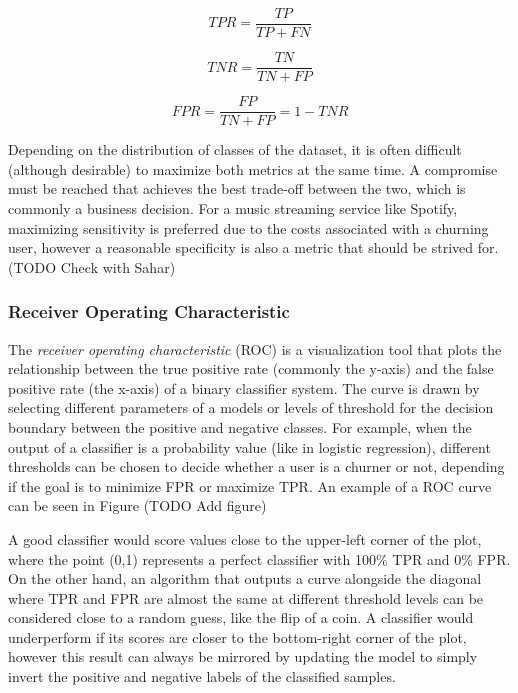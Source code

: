 \documentclass{kththesis}
\begin{document}
\begin{equation}
TPR = \frac{TP}{TP + FN}
\end{equation}

\begin{equation}
TNR = \frac{TN}{TN + FP}
\end{equation}

\begin{equation}
FPR = \frac{FP}{TN + FP} = 1 - TNR
\end{equation}

Depending on the distribution of classes of the dataset, it is often difficult (although desirable) to maximize both metrics at the same time. A compromise must be reached that achieves the best trade-off between the two, which is commonly a business decision. For a music streaming service like Spotify, maximizing sensitivity is preferred due to the costs associated with a churning user, however a reasonable specificity is also a metric that should be strived for. (TODO Check with Sahar)

\subsubsection{Receiver Operating Characteristic}

The \emph{receiver operating characteristic} (ROC) is a visualization tool that plots the relationship between the true positive rate (commonly the y-axis) and the false positive rate (the x-axis) of a binary classifier system. The curve is drawn by selecting different parameters of a models or levels of threshold for the decision boundary between the positive and negative classes. For example, when the output of a classifier is a probability value (like in logistic regression), different thresholds can be chosen to decide whether a user is a churner or not, depending if the goal is to minimize FPR or maximize TPR. An example of a ROC curve can be seen in Figure (TODO Add figure)

A good classifier would score values close to the upper-left corner of the plot, where the point (0,1) represents a perfect classifier with 100\% TPR and 0\% FPR. On the other hand, an algorithm that outputs a curve alongside the diagonal where TPR and FPR are almost the same at different threshold levels can be considered close to a random guess, like the flip of a coin. A classifier would underperform if its scores are closer to the bottom-right corner of the plot, however this result can always be mirrored by updating the model to simply invert the positive and negative labels of the classified samples.
\end{document}
